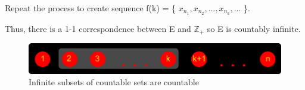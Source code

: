	Repeat the process to create sequence f(k) = \{ $x_{n_1}, x_{n_2}, ... , x_{n_k} , ...$ \}.

	Thus, there is a 1-1 correspondence between E and $\mathbb{Z}_+$ so
	E is countably infinite.

\begin{figure}[h]
	\centering
	\includegraphics[scale=0.45]{Images/4.3.6.png}
	\caption{Infinite subsets of countable sets are countable}
\end{figure}





